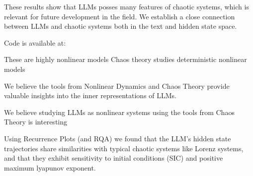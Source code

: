 These results show that LLMs posses many features of chaotic systems, which is relevant for future development in the field.
We establish a close connection between LLMs and chaotic systems both in the text and hidden state space.


Code is available at: 



These are highly nonlinear models
Chaos theory studies deterministic nonlinear models

We believe the tools from Nonlinear Dynamics and Chaos Theory provide valuable insights into the inner representations of LLMs.

We believe studying LLMs as nonlinear systems using the tools from Chaos Theory is interesting





Using Recurrence Plots (and RQA) we found that the LLM's hidden state trajectories share similarities with typical chaotic systems like Lorenz systems, and that they exhibit sensitivity to initial conditions (SIC) and positive maximum lyapunov exponent.












